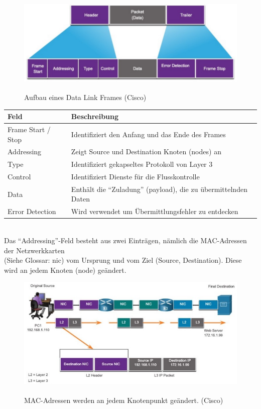 \begin{figure}[H]
    \begin{center}
    \label{pic:DataLinkFrame}
    \includegraphics[width=\textwidth]{images/Data_Link_Frame.jpg}
    \caption{Aufbau eines Data Link Frames (\textsuperscript{\textcopyright}Cisco)}
    \end{center}
\end{figure}

\begin{tabularx}{\textwidth}{lX}
    Feld&Beschreibung\\
    \hline
    Frame Start / Stop&Identifiziert den Anfang und das Ende des Frames\\
    Addressing&Zeigt Source und Destination Knoten (nodes) an\\
    Type&Identifiziert gekapseltes Protokoll von Layer 3\\
    Control&Identifiziert Dienste für die Flusskontrolle\\
    Data&Enthält die "`Zuladung"' (payload), die zu übermittelnden Daten\\
    Error Detection&Wird verwendet um Übermittlungsfehler zu entdecken\\
    \hline
\end{tabularx}\\

Das "`Addressing"'-Feld besteht aus zwei Einträgen, nämlich die MAC-Adressen der Netzwerkkarten\\
(Siehe Glossar: \acrshort{nic}) vom Ursprung und vom Ziel (Source, Destination). Diese wird an jedem Knoten (node) geändert.

\begin{figure}[H]
    \begin{center}
    \label{pic:DataLinkFrameAddresses}
    \includegraphics[width=\textwidth]{images/Data_Link_Frame_Addresses.jpg}
    \caption{MAC-Adressen werden an jedem Knotenpunkt geändert. (\textsuperscript{\textcopyright}Cisco)}
    \end{center}
\end{figure}

